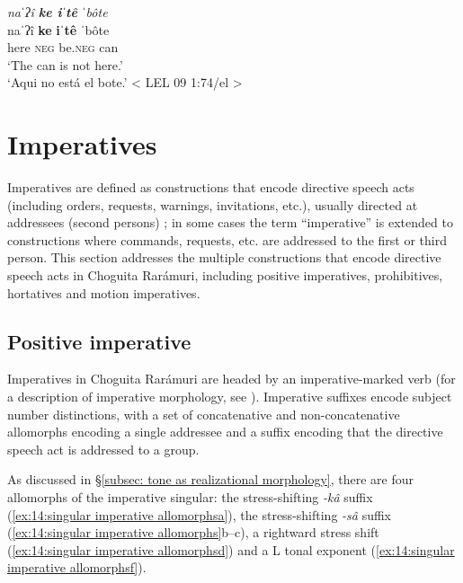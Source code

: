     \textit{naˈʔî  \textbf{ke iˈtê} ˈbôte}\\
    \gll    naˈʔî  \textbf{ke} \textbf{iˈtê} ˈbôte\\
            here  {\textsc{neg}} {be.\textsc{neg}} can\\
    \glt    ‘The can is not here.’\\
    \glt    ‘Aqui no está el bote.’ < LEL 09 1:74/el >\\

\z

\section{Imperatives}
\label{sec: imperative constructions}

Imperatives are defined as constructions that encode directive speech acts (including orders, requests, warnings, invitations, etc.), usually directed at addres\-sees (second persons) \citet{konig2007speech}; in some cases the term ``imperative'' is extended to constructions where commands, requests, etc. are addressed to the first or third person. This section addresses the multiple constructions that encode directive speech acts in Choguita Rarámuri, including positive imperatives, prohibitives, hortatives and motion imperatives.


\subsection{Positive imperative}
\label{subsec: positive imperatives}

Imperatives in Choguita Rarámuri are headed by an imperative-marked verb (for a description of imperative morphology, see ). Imperative suffixes encode subject number distinctions, with a set of concatenative and non-concatena\-tive allomorphs encoding a single addressee and a suffix encoding that the directive speech act is addressed to a group.

As discussed in §\ref{subsec: tone as realizational morphology}, there are four allomorphs of the imperative singular: the stress-shifting \textit{-kâ} suffix (\ref{ex:14:singular imperative allomorphsa}), the stress-shifting \textit{-sâ} suffix (\ref{ex:14:singular imperative allomorphs}b--c), a rightward stress shift (\ref{ex:14:singular imperative allomorphsd}) and a L tonal exponent (\ref{ex:14:singular imperative allomorphsf}).

